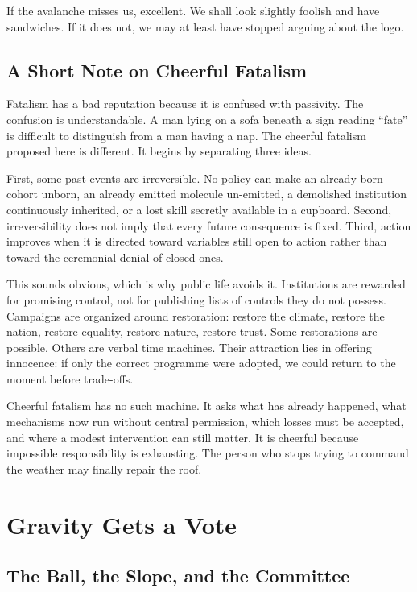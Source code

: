 \documentclass[12pt,a4paper]{book}
\begin{document}
If the avalanche misses us, excellent.  We shall look slightly foolish and
have sandwiches.  If it does not, we may at least have stopped arguing about
the logo.

\chapter*{A Short Note on Cheerful Fatalism}

Fatalism has a bad reputation because it is confused with passivity.  The
confusion is understandable.  A man lying on a sofa beneath a sign reading
``fate'' is difficult to distinguish from a man having a nap.  The cheerful
fatalism proposed here is different.  It begins by separating three ideas.

First, some past events are irreversible.  No policy can make an already born
cohort unborn, an already emitted molecule un-emitted, a demolished institution
continuously inherited, or a lost skill secretly available in a cupboard.
Second, irreversibility does not imply that every future consequence is fixed.
Third, action improves when it is directed toward variables still open to
action rather than toward the ceremonial denial of closed ones.

This sounds obvious, which is why public life avoids it.  Institutions are
rewarded for promising control, not for publishing lists of controls they do
not possess.  Campaigns are organized around restoration: restore the climate,
restore the nation, restore equality, restore nature, restore trust.  Some
restorations are possible.  Others are verbal time machines.  Their attraction
lies in offering innocence: if only the correct programme were adopted, we
could return to the moment before trade-offs.

Cheerful fatalism has no such machine.  It asks what has already happened,
what mechanisms now run without central permission, which losses must be
accepted, and where a modest intervention can still matter.  It is cheerful
because impossible responsibility is exhausting.  The person who stops trying
to command the weather may finally repair the roof.

\mainmatter

\part{Gravity Gets a Vote}

\chapter{The Ball, the Slope, and the Committee}
\label{chap:ball-slope-committee}
\end{document}
